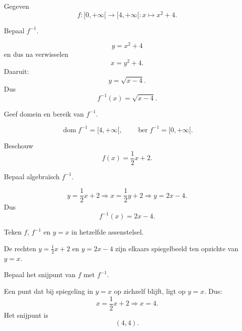 \documentclass{ximera}
\begin{document}
\begin{oefening}{\oefB\ESS}

Gegeven
\[
f:[0,+\infty[\to[4,+\infty[:x\mapsto x^2+4.
\]

\begin{question}
Bepaal \(f^{-1}\).

\begin{oplossing}
\[
y=x^2+4
\]
en dus na verwisselen
\[
x=y^2+4.
\]
Daaruit:
\[
y=\sqrt{x-4}.
\]
Dus
\[
\boxed{f^{-1}(x)=\sqrt{x-4}.}
\]
\end{oplossing}
\end{question}

\begin{question}
Geef domein en bereik van \(f^{-1}\).

\begin{oplossing}
\[
\operatorname{dom}f^{-1}=[4,+\infty[,
\qquad
\operatorname{ber}f^{-1}=[0,+\infty[.
\]
\end{oplossing}
\end{question}

\end{oefening}




\begin{oefening}{\oefU\ESS}

Beschouw
\[
f(x)=\frac12x+2.
\]

\begin{question}
Bepaal algebraïsch \(f^{-1}\).

\begin{oplossing}
\[
y=\frac12x+2
\Longrightarrow
x=\frac12y+2
\Longrightarrow
y=2x-4.
\]
Dus
\[
f^{-1}(x)=2x-4.
\]
\end{oplossing}
\end{question}

\begin{question}
Teken \(f\), \(f^{-1}\) en \(y=x\) in hetzelfde assenstelsel.

\begin{oplossing}
De rechten \(y=\frac12x+2\) en \(y=2x-4\) zijn elkaars spiegelbeeld
ten opzichte van \(y=x\).
\end{oplossing}
\end{question}

\begin{question}
Bepaal het snijpunt van \(f\) met \(f^{-1}\).

\begin{oplossing}
Een punt dat bij spiegeling in \(y=x\) op zichzelf blijft, ligt op \(y=x\).
Dus:
\[
x=\frac12x+2
\Longrightarrow x=4.
\]
Het snijpunt is
\[
(4,4).
\]
\end{oplossing}
\end{question}

\end{oefening}
\end{document}
